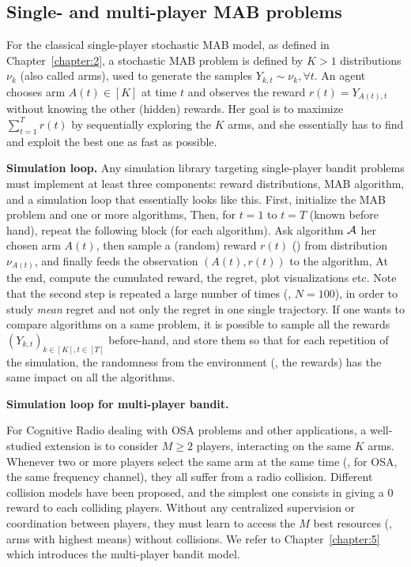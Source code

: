 \subsection{Single- and multi-player MAB problems}

For the classical single-player stochastic MAB model, as defined in Chapter~\ref{chapter:2},
a stochastic MAB problem is defined by $K>1$ distributions $\nu_k$ (also called arms),
used to generate the \iid{} samples $Y_{k,t} \sim \nu_k, \forall t$.
An agent chooses arm $A(t)\in[K]$ at time $t$ and observes the reward $r(t) = Y_{A(t),t}$ without knowing the other (hidden) rewards.
Her goal is to maximize $\sum_{t=1}^T r(t)$ by sequentially exploring the $K$ arms, and she essentially has to find and exploit the best one as fast as possible.

\textbf{Simulation loop.}
%
Any simulation library targeting single-player bandit problems must implement at least three components:
reward distributions, MAB algorithm, and a simulation loop that essentially looks like this.
    First, initialize the MAB problem and one or more algorithms,
    Then, for $t=1$ to $t=T$ (known before hand), repeat the following block (for each algorithm). Ask algorithm $\mathcal{A}$ her chosen arm $A(t)$, then sample a (random) reward $r(t)$ (\iid) from distribution $\nu_{A(t)}$, and finally feeds the observation $(A(t), r(t))$ to the algorithm,
    At the end, compute the cumulated reward, the regret, plot visualizations etc.
%
Note that the second step is repeated a large number of times (\eg, $N=100$), in order to study \emph{mean} regret and not only the regret in one single trajectory.
If one wants to compare algorithms on a same problem, it is possible to sample all the rewards $(Y_{k,t})_{k\in[K], t\in[T]}$ before-hand, and store them so that for each repetition of the simulation, the randomness from the environment (\ie, the rewards) has the same impact on all the algorithms.


\textbf{Simulation loop for multi-player bandit.}

For Cognitive Radio dealing with OSA problems and other applications, a well-studied extension is to consider $M\geq2$ players, interacting on the same $K$ arms.
Whenever two or more players select the same arm at the same time (\eg, for OSA, the same frequency channel), they all suffer from a radio collision.
%
Different collision models have been proposed, and the simplest one consists in giving a $0$ reward to each colliding players.
Without any centralized supervision or coordination between players, they must learn to access the $M$ best resources (\ie, arms with highest means) without collisions.
We refer to Chapter~\ref{chapter:5} which introduces the multi-player bandit model.

